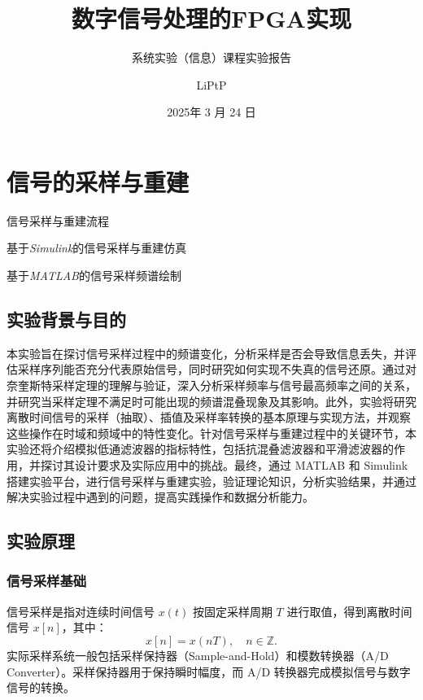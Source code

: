 \documentclass[lang=cn,newtx,10pt,scheme=chinese]{elegantbook}
\title{数字信号处理的FPGA实现}
\subtitle{系统实验（信息）课程实验报告}
\author{LiPtP}
\institute{吴健雄学院}
\date{2025年 3 月 24 日}
\begin{document}
\maketitle
\frontmatter

\tableofcontents

\mainmatter

\chapter{信号的采样与重建}

\begin{introduction}
  \item 信号采样与重建流程
  \item 基于\textit{Simulink}的信号采样与重建仿真
  \item 基于\textit{MATLAB}的信号采样频谱绘制
\end{introduction}

\section{实验背景与目的}
  

本实验旨在探讨信号采样过程中的频谱变化，分析采样是否会导致信息丢失，并评估采样序列能否充分代表原始信号，同时研究如何实现不失真的信号还原。通过对奈奎斯特采样定理的理解与验证，深入分析采样频率与信号最高频率之间的关系，并研究当采样定理不满足时可能出现的频谱混叠现象及其影响。此外，实验将研究离散时间信号的采样（抽取）、插值及采样率转换的基本原理与实现方法，并观察这些操作在时域和频域中的特性变化。针对信号采样与重建过程中的关键环节，本实验还将介绍模拟低通滤波器的指标特性，包括抗混叠滤波器和平滑滤波器的作用，并探讨其设计要求及实际应用中的挑战。最终，通过 MATLAB 和 Simulink 搭建实验平台，进行信号采样与重建实验，验证理论知识，分析实验结果，并通过解决实验过程中遇到的问题，提高实践操作和数据分析能力。

\section{实验原理}

\subsection{信号采样基础}
信号采样是指对连续时间信号 $x(t)$ 按固定采样周期 $T$ 进行取值，得到离散时间信号 $x[n]$，其中：
\begin{equation}
    x[n] = x(nT), \quad n \in \mathbb{Z}.
\end{equation}
实际采样系统一般包括采样保持器（Sample-and-Hold）和模数转换器（A/D Converter）。采样保持器用于保持瞬时幅度，而 A/D 转换器完成模拟信号与数字信号的转换。
\end{document}
